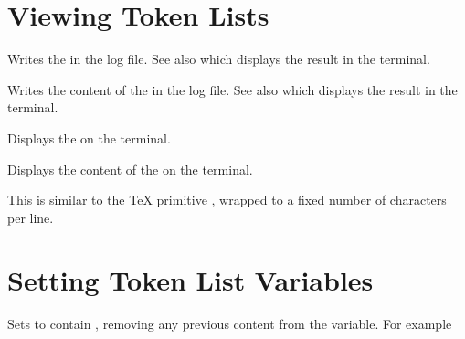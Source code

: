 \documentclass[oneside]{book}
\let\tn=\cs
\begin{document}
\section{Viewing Token Lists}

\begin{function}{\TlLog}
\begin{syntax}
 
\end{syntax}
Writes the  in the log file. See also
 which displays the result in the terminal.
\end{function}

\begin{function}{\TlVarLog}
\begin{syntax}
 
\end{syntax}
Writes the content of the  in the log file. See also
 which displays the result in the terminal.
\end{function}

\begin{function}{\TlShow}
\begin{syntax}
 
\end{syntax}
Displays the  on the terminal.
\end{function}

\begin{function}{\TlVarShow}
\begin{syntax}
 
\end{syntax}
Displays the content of the  on the terminal.
\begin{texnote}
This is similar to the \TeX{} primitive \tn{show}, wrapped to a
fixed number of characters per line.
\end{texnote}
\end{function}

\section{Setting Token List Variables}

\begin{function}{\TlSet}
\begin{syntax}
  
\end{syntax}
Sets  to contain ,
removing any previous content from the variable. For example
\begin{demohigh}
\TlSet {}
\TlUse \lTmpiTl
\end{demohigh}
\end{function}
\end{document}
